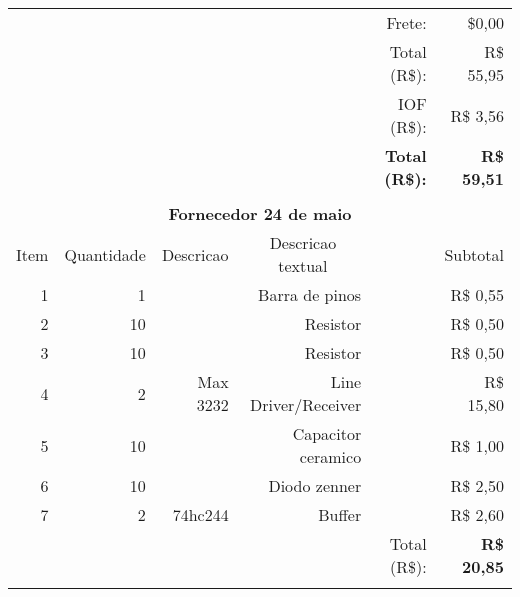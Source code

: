 \begin{table}[!h]
\begin{tabular}{rrrrrr}
          &       &       &       & Frete: & \$0,00 \\
          &       &       &       & Total (R\$): & R\$ 55,95 \\
          &       &       &       & IOF (R\$): & R\$ 3,56 \\
          &       &       &       & \textbf{Total (R\$):} & \textbf{R\$ 59,51} \\
          &       &       &       &       &  \\
    \multicolumn{6}{c}{\textbf{Fornecedor 24 de maio}} \\
    \multicolumn{1}{c}{Item} & \multicolumn{1}{c}{Quantidade} & \multicolumn{1}{c}{Descricao} & \multicolumn{1}{c}{Descricao textual} &       & Subtotal \\
    1     & 1     &       & Barra de pinos &       & R\$ 0,55 \\
    2     & 10    &       & Resistor &       & R\$ 0,50 \\
    3     & 10    &       & Resistor &       & R\$ 0,50 \\
    4     & 2     & Max 3232 & Line Driver/Receiver &       & R\$ 15,80 \\
    5     & 10    &       & Capacitor ceramico &       & R\$ 1,00 \\
    6     & 10    &       & Diodo zenner &       & R\$ 2,50 \\
    7     & 2     & 74hc244 & Buffer  &       & R\$ 2,60 \\
          &       &       &       & Total (R\$): & \textbf{R\$ 20,85} \\
          &       &       &       &       &  \\

    \bottomrule
    \end{tabular}%
  \label{tab:addlabel}%
\end{table}%
